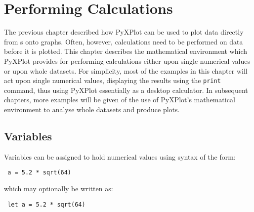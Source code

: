 %
%
%
%
%



\chapter{Performing Calculations}

The previous chapter described how PyXPlot can be used to plot data directly
from \datafile s onto graphs. Often, however, calculations need to be performed
on data before it is plotted. This chapter describes the mathematical
environment which PyXPlot provides for performing calculations either upon
single numerical values or upon whole datasets.  For simplicity, most of the
examples in this chapter will act upon single numerical values, displaying the
results using the {\tt print} command, thus using PyXPlot essentially as a
desktop calculator. In subsequent chapters, more examples will be given of the
use of PyXPlot's mathematical environment to analyse whole datasets and produce
plots.

\section{Variables}

Variables can be assigned to hold numerical values using syntax of the form:

\begin{verbatim} a = 5.2 * sqrt(64) \end{verbatim}

\noindent which may optionally be written as:

\begin{verbatim} let a = 5.2 * sqrt(64) \end{verbatim}

